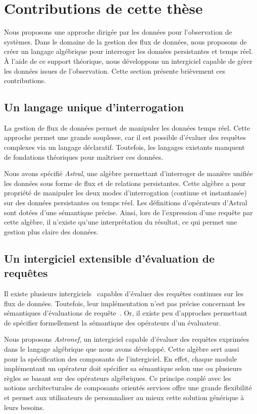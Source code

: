 \section{Contributions de cette thèse}\label{sec:intro:demarche}
Nous proposons une approche dirigée par les données pour l'observation de systèmes. Dans le domaine de la gestion des flux de données, nous proposons de créer un langage algébrique pour interroger les données persistantes et temps réel. À l'aide de ce support théorique, nous développons un intergiciel capable de gérer les données issues de l'observation. Cette section présente brièvement ces contributions.

\subsection{Un langage unique d'interrogation}
La gestion de flux de données permet de manipuler les données temps réel. Cette approche permet une grande souplesse, car il est possible d'évaluer des requêtes complexes via un langage déclaratif. Toutefois, les langages existants manquent de fondations théoriques pour maîtriser ces données.

Nous avons spécifié \textit{Astral}, une algèbre permettant d'interroger de manière unifiée les données sous forme de flux et de relations persistantes. Cette algèbre a pour propriété de manipuler les deux modes d'interrogation (continue et instantanée) sur des données persistantes ou temps réel. Les définitions d'opérateurs d'Astral sont dotées d'une sémantique précise. Ainsi, lors de l'expression d'une requête par cette algèbre, il n'existe qu'une interprétation du résultat, ce qui permet une gestion plus claire des données.

\subsection{Un intergiciel extensible d'évaluation de requêtes}
Il existe plusieurs intergiciels~\cite{Arasu:stream,url:aleri} capables d'évaluer des requêtes continues sur les flux de données. Toutefois, leur implémentation n'est pas précise concernant les sémantiques d'évaluations de requête~\cite{Jain:spread,Botan:secret}. Or, il existe peu d'approches permettant de spécifier formellement la sémantique des opérateurs d'un évaluateur.

Nous proposons \textit{Astronef}, un intergiciel capable d'évaluer des requêtes exprimées dans le langage algébrique que nous avons développé. Cette algèbre sert aussi pour la spécification des composants de l'intergiciel. En effet, chaque module implémentant un opérateur doit spécifier sa sémantique selon une ou plusieurs règles se basant sur des opérateurs algébriques. Ce principe couplé avec les notions architecturales de composants orientés services offre une grande flexibilité et permet aux utilisateurs de personnaliser au mieux cette solution générique à leurs besoins.

